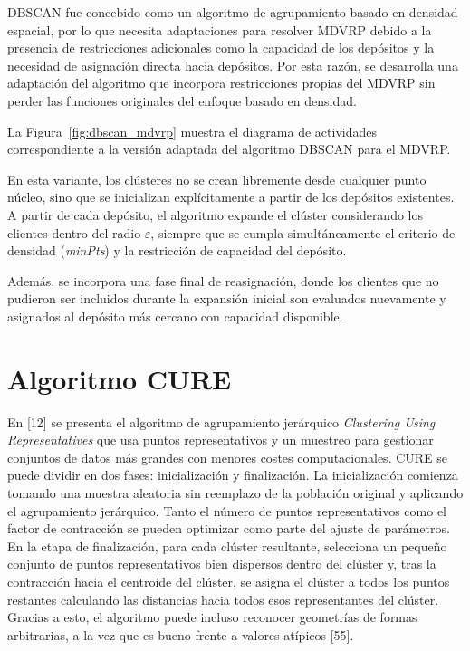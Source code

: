 
DBSCAN fue concebido como un algoritmo de agrupamiento basado en densidad espacial, por lo que necesita adaptaciones para resolver MDVRP debido a la presencia de restricciones adicionales como la capacidad de los dep\'ositos y la necesidad de asignaci\'on directa hacia dep\'ositos. Por esta raz\'on, se desarrolla una adaptaci\'on del algoritmo que incorpora restricciones propias del MDVRP sin perder las funciones originales del enfoque basado en densidad.

La Figura~\ref{fig:dbscan_mdvrp} muestra el diagrama de actividades correspondiente a la versi\'on adaptada del algoritmo DBSCAN para el MDVRP.


En esta variante, los cl\'usteres no se crean libremente desde cualquier punto n\'ucleo, sino que se inicializan expl\'icitamente a partir de los dep\'ositos existentes. A partir de cada dep\'osito, el algoritmo expande el cl\'uster considerando los clientes dentro del radio $\varepsilon$, siempre que se cumpla simult\'aneamente el criterio de densidad (\textit{minPts}) y la restricci\'on de capacidad del dep\'osito.

Adem\'as, se incorpora una fase final de reasignaci\'on, donde los clientes que no pudieron ser incluidos durante la expansi\'on inicial son evaluados nuevamente y asignados al dep\'osito m\'as cercano con capacidad disponible.

\section{Algoritmo CURE}

En [12] se presenta el algoritmo de agrupamiento jer\'arquico \textit{Clustering Using Representatives} que usa puntos representativos y un muestreo para gestionar conjuntos de datos m\'as grandes con menores costes computacionales. CURE se puede dividir en dos fases: inicializaci\'on y finalizaci\'on. La inicializaci\'on comienza tomando una muestra aleatoria sin reemplazo de la poblaci\'on original y aplicando el agrupamiento jer\'arquico. Tanto el n\'umero de puntos representativos como el factor de contracci\'on se pueden optimizar como parte del ajuste de par\'ametros. En la etapa de finalizaci\'on, para cada cl\'uster resultante, selecciona un peque\~no conjunto de puntos representativos bien dispersos dentro del cl\'uster y, tras la contracci\'on hacia el centroide del cl\'uster, se asigna el cl\'uster a todos los puntos restantes calculando las distancias hacia todos esos representantes del cl\'uster. Gracias a esto, el algoritmo puede incluso reconocer geometr\'ias de formas arbitrarias, a la vez que es bueno frente a valores at\'ipicos [55].

